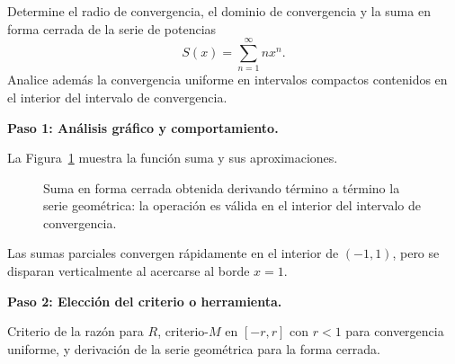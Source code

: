 \begin{example}
Determine el radio de convergencia, el dominio de convergencia y la
suma en forma cerrada de la serie de potencias
\[
    S(x) = \sum_{n=1}^\infty n x^n.
\]
Analice además la convergencia uniforme en intervalos compactos
contenidos en el interior del intervalo de convergencia.
\begin{myproof}
\textbf{Paso 1: Análisis gráfico y comportamiento.}

La Figura~\ref{fig:ssf_derivacion_geometrica} muestra la función suma y sus aproximaciones.

\begin{figure}[H]
\centering
{}
\caption{Suma en forma cerrada obtenida derivando término a término la serie geométrica: la operación es válida en el interior del intervalo de convergencia.}
\label{fig:ssf_derivacion_geometrica}
\end{figure}

Las sumas parciales convergen rápidamente en el interior de $(-1,1)$,
pero se disparan verticalmente al acercarse al borde $x=1$.

\textbf{Paso 2: Elección del criterio o herramienta.}

Criterio de la razón para $R$, criterio-$M$ en $[-r,r]$ con $r<1$
para convergencia uniforme, y derivación de la serie geométrica para
la forma cerrada.


\end{myproof}
\end{example}
